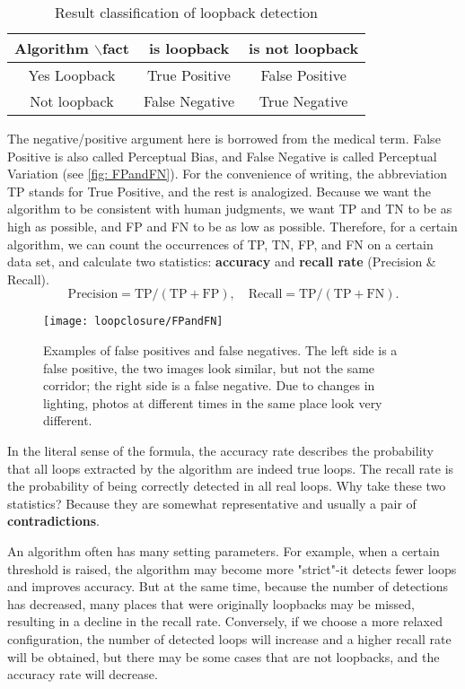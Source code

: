 \begin{table}[! htp]
\centering
\caption{Result classification of loopback detection}
\label{table: loopclosure}
\begin{tabu}{c | c | c}
\toprule
Algorithm $\backslash $fact & is loopback & is not loopback \\
\midrule
Yes Loopback & True Positive & False Positive \\
Not loopback & False Negative & True Negative \\
\bottomrule
\end{tabu}
\end{table}

The negative/positive argument here is borrowed from the medical term. False Positive is also called Perceptual Bias, and False Negative is called Perceptual Variation (see \autoref{fig: FPandFN}). For the convenience of writing, the abbreviation TP stands for True Positive, and the rest is analogized. Because we want the algorithm to be consistent with human judgments, we want TP and TN to be as high as possible, and FP and FN to be as low as possible. Therefore, for a certain algorithm, we can count the occurrences of TP, TN, FP, and FN on a certain data set, and calculate two statistics: \textbf{accuracy} and \textbf{recall rate} (Precision \& Recall).
\begin{equation}
\mathrm{Precision} = \mathrm{TP}/(\mathrm{TP}+\mathrm{FP}), \quad \mathrm{Recall} = \mathrm{TP}/(\mathrm{TP}+\mathrm{FN}).
\end{equation}

\vspace{-\medskipamount}
\begin{figure}[! htp]
\centering
\texttt{[image: loopclosure/FPandFN]}
\caption{Examples of false positives and false negatives. The left side is a false positive, the two images look similar, but not the same corridor; the right side is a false negative. Due to changes in lighting, photos at different times in the same place look very different. }
\label{fig: FPandFN}
\end{figure}

In the literal sense of the formula, the accuracy rate describes the probability that all loops extracted by the algorithm are indeed true loops. The recall rate is the probability of being correctly detected in all real loops. Why take these two statistics? Because they are somewhat representative and usually a pair of \textbf{contradictions}.

An algorithm often has many setting parameters. For example, when a certain threshold is raised, the algorithm may become more "strict"-it detects fewer loops and improves accuracy. But at the same time, because the number of detections has decreased, many places that were originally loopbacks may be missed, resulting in a decline in the recall rate. Conversely, if we choose a more relaxed configuration, the number of detected loops will increase and a higher recall rate will be obtained, but there may be some cases that are not loopbacks, and the accuracy rate will decrease.

